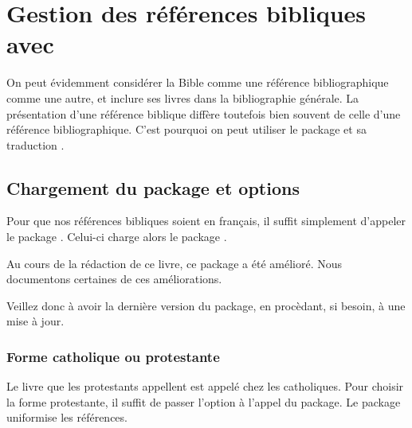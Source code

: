\chapter{Gestion des références bibliques avec }

\begin{intro}

On peut évidemment considérer la Bible comme une référence bibliographique comme une autre, et inclure ses livres dans la bibliographie générale.
La présentation d'une référence biblique diffère toutefois bien souvent de celle d'une référence bibliographique.
C'est pourquoi on peut utiliser le package  et sa traduction .
\end{intro}


\section{Chargement du package et options}

Pour que nos références bibliques soient en français, il suffit simplement d'appeler le package . Celui-ci charge alors le package .


\begin{latexcode}
\usepackage{bibleref-french}
\end{latexcode}

\begin{attention}
Au cours de la rédaction de ce livre, ce package a été amélioré. Nous documentons certaines de ces améliorations. 

Veillez donc à avoir la dernière version du package, en procèdant, si besoin, à une mise à jour.

\end{attention}

\subsection{Forme catholique ou protestante}
Le livre que les protestants appellent  est appelé  chez les catholiques. Pour choisir la forme protestante, il suffit de passer l'option  à l'appel du package. Le package uniformise les références.

\begin{latexcode}
\usepackage[protestant]{bibleref}
\end{latexcode}

